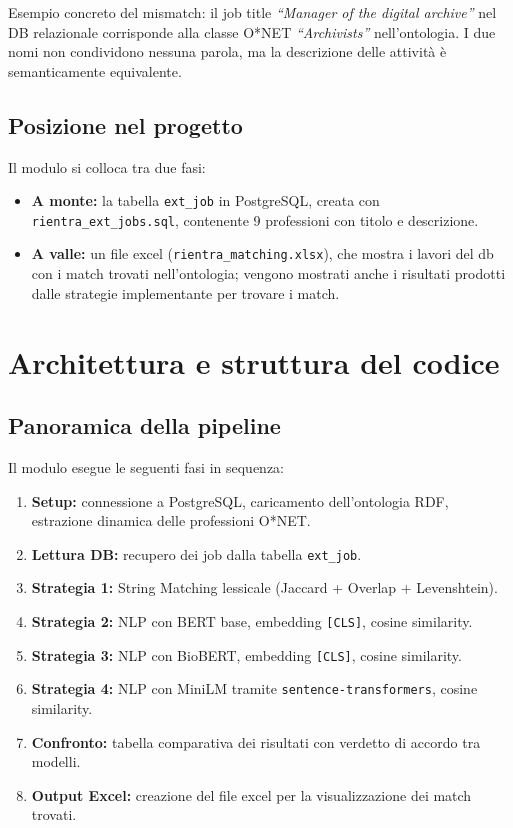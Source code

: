 \documentclass[12pt, a4paper]{report}
\begin{document}
\begin{notebox}
Esempio concreto del mismatch: il job title \textit{``Manager of the
digital archive''} nel DB relazionale corrisponde alla classe O*NET
\textit{``Archivists''} nell'ontologia. I due nomi non condividono
nessuna parola, ma la descrizione delle attività è semanticamente
equivalente.
\end{notebox}

\section{Posizione nel progetto}

Il modulo si colloca tra due fasi:

\begin{itemize}
  \item \textbf{A monte:} la tabella \texttt{ext\_job} in PostgreSQL,
        creata con \texttt{rientra\_ext\_jobs.sql}, contenente 9
        professioni con titolo e descrizione.
  \item \textbf{A valle:} un file excel
        (\texttt{rientra\_matching.xlsx}), che mostra i lavori del db con i match trovati nell'ontologia; vengono mostrati anche i risultati prodotti dalle strategie implementante per trovare i match.
\end{itemize}

% 
\chapter{Architettura e struttura del codice}
% 

\section{Panoramica della pipeline}

Il modulo esegue le seguenti fasi in sequenza:

\begin{enumerate}
  \item \textbf{Setup:} connessione a PostgreSQL, caricamento
        dell'ontologia RDF, estrazione dinamica delle professioni O*NET.
  \item \textbf{Lettura DB:} recupero dei job dalla tabella
        \texttt{ext\_job}.
  \item \textbf{Strategia 1:} String Matching lessicale
        (Jaccard + Overlap + Levenshtein).
  \item \textbf{Strategia 2:} NLP con BERT base,
        embedding \texttt{[CLS]}, cosine similarity.
  \item \textbf{Strategia 3:} NLP con BioBERT,
        embedding \texttt{[CLS]}, cosine similarity.
  \item \textbf{Strategia 4:} NLP con MiniLM tramite
        \texttt{sentence-transformers}, cosine similarity.
  \item \textbf{Confronto:} tabella comparativa dei risultati
        con verdetto di accordo tra modelli.
  \item \textbf{Output Excel:} creazione del file excel per la visualizzazione dei match trovati.
\end{enumerate}
\end{document}
